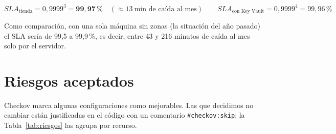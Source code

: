 \documentclass[11pt,letterpaper]{article}
\begin{document}
\[
SLA_{\text{tienda}} = 0{,}9999^{3} = \mathbf{99{,}97\,\text{\%}}\quad(\approx 13\ \text{min de caída al mes})
\qquad
SLA_{\text{con Key Vault}} = 0{,}9999^{4} = 99{,}96\,\text{\%}
\]

Como comparación, con una sola máquina sin zonas (la situación del año pasado) el SLA sería de
99,5 a 99,9\,\%, es decir, entre 43 y 216 minutos de caída al mes solo por el servidor.

\section{Riesgos aceptados}
Checkov marca algunas configuraciones como mejorables. Las que decidimos no cambiar están
justificadas en el código con un comentario \texttt{\#checkov:skip}; la Tabla~\ref{tab:riesgos}
las agrupa por recurso.
\end{document}
